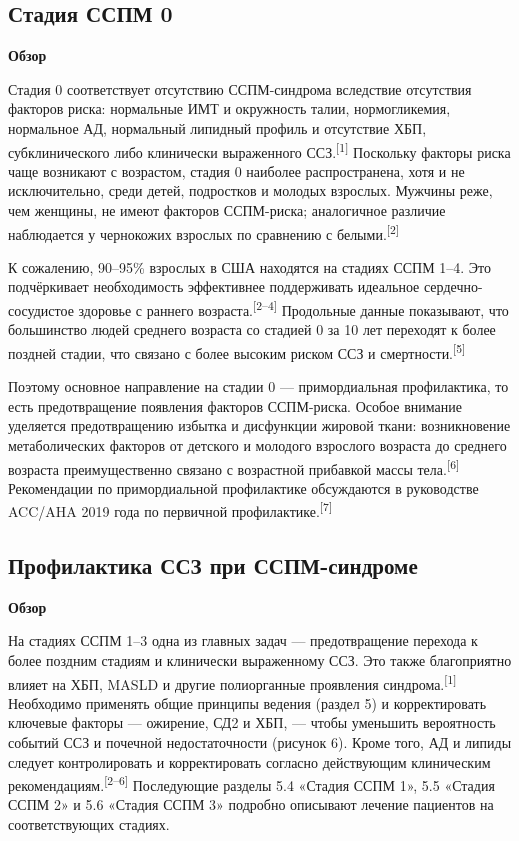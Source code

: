 \documentclass[11pt,a4paper]{article}
\newcommand{\src}[1]{\textsuperscript{[#1]}}
\newcommand{\heading}[1]{\par\medskip\textbf{#1}\par}
\begin{document}
\subsection{Стадия ССПМ 0}
\heading{Обзор}
Стадия 0 соответствует отсутствию ССПМ-синдрома вследствие отсутствия факторов риска: нормальные ИМТ и окружность талии, нормогликемия, нормальное АД, нормальный липидный профиль и отсутствие ХБП, субклинического либо клинически выраженного ССЗ.\src{1} Поскольку факторы риска чаще возникают с возрастом, стадия 0 наиболее распространена, хотя и не исключительно, среди детей, подростков и молодых взрослых. Мужчины реже, чем женщины, не имеют факторов ССПМ-риска; аналогичное различие наблюдается у чернокожих взрослых по сравнению с белыми.\src{2}

К сожалению, 90--95\% взрослых в США находятся на стадиях ССПМ 1--4. Это подчёркивает необходимость эффективнее поддерживать идеальное сердечно-сосудистое здоровье с раннего возраста.\src{2--4} Продольные данные показывают, что большинство людей среднего возраста со стадией 0 за 10 лет переходят к более поздней стадии, что связано с более высоким риском ССЗ и смертности.\src{5}

Поэтому основное направление на стадии 0 --- примордиальная профилактика, то есть предотвращение появления факторов ССПМ-риска. Особое внимание уделяется предотвращению избытка и дисфункции жировой ткани: возникновение метаболических факторов от детского и молодого взрослого возраста до среднего возраста преимущественно связано с возрастной прибавкой массы тела.\src{6} Рекомендации по примордиальной профилактике обсуждаются в руководстве ACC/AHA 2019 года по первичной профилактике.\src{7}

\subsection{Профилактика ССЗ при ССПМ-синдроме}
\heading{Обзор}
На стадиях ССПМ 1--3 одна из главных задач --- предотвращение перехода к более поздним стадиям и клинически выраженному ССЗ. Это также благоприятно влияет на ХБП, MASLD и другие полиорганные проявления синдрома.\src{1} Необходимо применять общие принципы ведения (раздел 5) и корректировать ключевые факторы --- ожирение, СД2 и ХБП, --- чтобы уменьшить вероятность событий ССЗ и почечной недостаточности (рисунок 6). Кроме того, АД и липиды следует контролировать и корректировать согласно действующим клиническим рекомендациям.\src{2--6} Последующие разделы 5.4 «Стадия ССПМ 1», 5.5 «Стадия ССПМ 2» и 5.6 «Стадия ССПМ 3» подробно описывают лечение пациентов на соответствующих стадиях.
\end{document}
